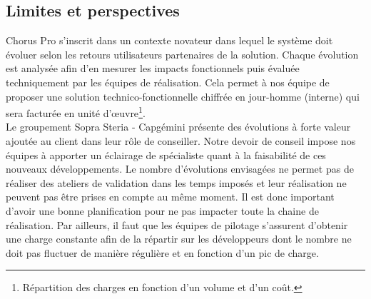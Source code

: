 \documentclass[12pt,a4paper]{article}
\begin{document}
\subsection{Limites et perspectives}
Chorus Pro s'inscrit dans un contexte novateur dans lequel le système doit évoluer selon les retours utilisateurs partenaires de la solution. Chaque évolution est analysée afin d'en mesurer les impacts fonctionnels puis évaluée techniquement par les équipes de réalisation. Cela permet à nos équipe de proposer une solution technico-fonctionnelle chiffrée en jour-homme (interne) qui sera facturée en unité d'œuvre\footnote{Répartition des charges en fonction d'un volume et d'un coût.}.\\
Le groupement Sopra Steria - Capgémini présente des évolutions à forte valeur ajoutée au client dans leur rôle de conseiller. Notre devoir de conseil impose nos équipes à apporter un éclairage de spécialiste quant à la faisabilité de ces nouveaux développements. Le nombre d'évolutions envisagées ne permet pas de réaliser des ateliers de validation dans les temps imposés et leur réalisation ne peuvent pas être prises en compte au même moment. Il est donc important d'avoir une bonne planification pour ne pas impacter toute la chaine de réalisation. Par ailleurs, il faut que les équipes de pilotage s'assurent d'obtenir une charge constante afin de la répartir sur les développeurs dont le nombre ne doit pas fluctuer de manière régulière et en fonction d'un pic de charge.\\ 
\clearpage
\newpage
\end{document}
